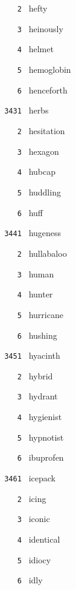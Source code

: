 \documentclass[11pt]{article}
\begin{document}
\begin{multicols}{6}
\noindent \texttt{ \ \ \ 2 } hefty  \par
\noindent \texttt{ \ \ \ 3 } heinously  \par
\noindent \texttt{ \ \ \ 4 } helmet  \par
\noindent \texttt{ \ \ \ 5 } hemoglobin  \par
\noindent \texttt{ \ \ \ 6 } henceforth  \par
\vspace{3mm}
\noindent \texttt{ 3431 } herbs  \par
\noindent \texttt{ \ \ \ 2 } hesitation  \par
\noindent \texttt{ \ \ \ 3 } hexagon  \par
\noindent \texttt{ \ \ \ 4 } hubcap  \par
\noindent \texttt{ \ \ \ 5 } huddling  \par
\noindent \texttt{ \ \ \ 6 } huff  \par
\vspace{3mm}
\noindent \texttt{ 3441 } hugeness  \par
\noindent \texttt{ \ \ \ 2 } hullabaloo  \par
\noindent \texttt{ \ \ \ 3 } human  \par
\noindent \texttt{ \ \ \ 4 } hunter  \par
\noindent \texttt{ \ \ \ 5 } hurricane  \par
\noindent \texttt{ \ \ \ 6 } hushing  \par
\vspace{3mm}
\noindent \texttt{ 3451 } hyacinth  \par
\noindent \texttt{ \ \ \ 2 } hybrid  \par
\noindent \texttt{ \ \ \ 3 } hydrant  \par
\noindent \texttt{ \ \ \ 4 } hygienist  \par
\noindent \texttt{ \ \ \ 5 } hypnotist  \par
\noindent \texttt{ \ \ \ 6 } ibuprofen  \par
\vspace{3mm}
\noindent \texttt{ 3461 } icepack  \par
\noindent \texttt{ \ \ \ 2 } icing  \par
\noindent \texttt{ \ \ \ 3 } iconic  \par
\noindent \texttt{ \ \ \ 4 } identical  \par
\noindent \texttt{ \ \ \ 5 } idiocy  \par
\noindent \texttt{ \ \ \ 6 } idly  \par

\end{multicols}
\end{document}
